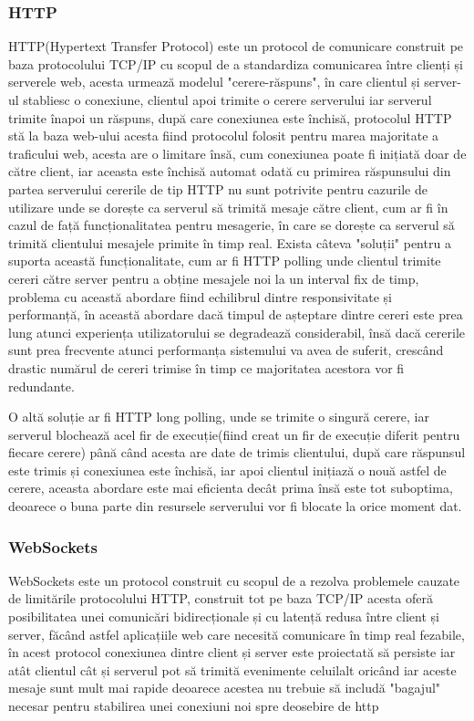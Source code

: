 \documentclass[12pt,a4paper,hidelinks]{report}
\theoremstyle{definition}
\theoremstyle{remark}
\begin{document}
\subsubsection{HTTP}
HTTP(Hypertext Transfer Protocol) este un protocol de comunicare construit pe baza protocolului TCP/IP cu scopul de a standardiza
comunicarea între clienți și serverele web, acesta urmează modelul "cerere-răspuns", în care
clientul și server-ul stabliesc o conexiune, clientul apoi trimite o cerere serverului iar serverul trimite înapoi un răspuns,
după care conexiunea este închisă, protocolul HTTP stă la baza web-ului acesta fiind protocolul folosit pentru marea majoritate
a traficului web, acesta are o limitare însă, cum conexiunea poate fi inițiată doar de către client, iar aceasta este închisă automat odată cu
primirea răspunsului din partea serverului cererile de tip HTTP nu sunt potrivite pentru cazurile de utilizare unde se dorește ca serverul să 
trimită mesaje către client, cum ar fi în cazul de față funcționalitatea pentru mesagerie, în care se dorește ca serverul 
să trimită clientului mesajele primite în timp real. Exista câteva "soluții" pentru a suporta această funcționalitate, cum ar fi HTTP polling
unde clientul trimite cereri către server pentru a obține mesajele noi la un interval fix de timp, problema cu această abordare fiind
echilibrul dintre responsivitate și performanță, în această abordare dacă timpul de așteptare dintre cereri este prea lung atunci experiența utilizatorului
se degradează considerabil, însă dacă cererile sunt prea frecvente atunci performanța sistemului va avea de suferit, crescând drastic numărul de cereri
trimise în timp ce majoritatea acestora vor fi redundante.

O altă soluție ar fi HTTP long polling, unde se trimite o singură cerere, iar serverul blochează acel fir de execuție(fiind creat un fir de execuție diferit pentru fiecare cerere) până când
acesta are date de trimis clientului, după care răspunsul este trimis și conexiunea este închisă, iar apoi clientul inițiază o nouă astfel de cerere,
aceasta abordare este mai eficienta decât prima însă este tot suboptima, deoarece o buna parte din resursele serverului vor fi blocate la orice moment dat.
\subsubsection{WebSockets}
WebSockets este un protocol construit cu scopul de a rezolva problemele cauzate de limitările protocolului HTTP, construit tot pe baza TCP/IP acesta oferă 
posibilitatea unei comunicări bidirecționale și cu latență redusa între client și server, făcând astfel aplicațiile web care necesită comunicare în timp real
fezabile, în acest protocol conexiunea dintre client și server este proiectată să persiste iar atât clientul cât și serverul pot să trimită evenimente
celuilalt oricând iar aceste mesaje sunt mult mai rapide deoarece acestea nu trebuie să includă "bagajul" necesar pentru stabilirea unei conexiuni noi 
spre deosebire de http
\end{document}
